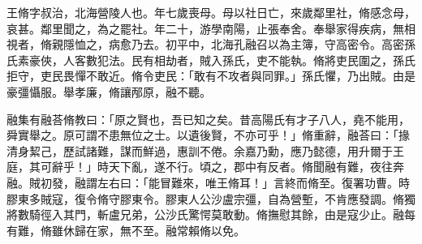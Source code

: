 
\begin{pinyinscope}
王脩字叔治，北海營陵人也。年七歲喪母。母以社日亡，來歲鄰里社，脩感念母，哀甚。鄰里聞之，為之罷社。年二十，游學南陽，止張奉舍。奉舉家得疾病，無相視者，脩親隱恤之，病愈乃去。初平中，北海孔融召以為主簿，守高密令。高密孫氏素豪俠，人客數犯法。民有相劫者，賊入孫氏，吏不能執。脩將吏民圍之，孫氏拒守，吏民畏憚不敢近。脩令吏民：「敢有不攻者與同罪。」孫氏懼，乃出賊。由是豪彊懾服。舉孝廉，脩讓邴原，融不聽。

融集有融荅脩教曰：「原之賢也，吾已知之矣。昔高陽氏有才子八人，堯不能用，舜實舉之。原可謂不患無位之士。以遺後賢，不亦可乎！」脩重辭，融荅曰：「掾清身絜己，歷試諸難，謀而鮮過，惠訓不倦。余嘉乃勳，應乃懿德，用升爾于王庭，其可辭乎！」時天下亂，遂不行。頃之，郡中有反者。脩聞融有難，夜往奔融。賊初發，融謂左右曰：「能冒難來，唯王脩耳！」言終而脩至。復署功曹。時膠東多賊寇，復令脩守膠東令。膠東人公沙盧宗彊，自為營塹，不肯應發調。脩獨將數騎徑入其門，斬盧兄弟，公沙氏驚愕莫敢動。脩撫慰其餘，由是寇少止。融每有難，脩雖休歸在家，無不至。融常賴脩以免。


\end{pinyinscope}
